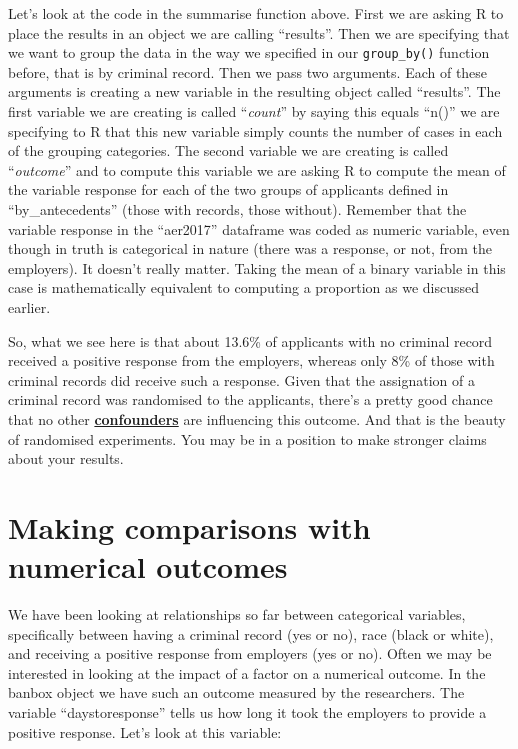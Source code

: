 \documentclass[
]{book}
\begin{document}
Let's look at the code in the summarise function above. First we are asking R to place the results in an object we are calling ``results''. Then we are specifying that we want to group the data in the way we specified in our \texttt{group\_by()} function before, that is by criminal record. Then we pass two arguments. Each of these arguments is creating a new variable in the resulting object called ``results''. The first variable we are creating is called ``\emph{count}'' by saying this equals ``n()'' we are specifying to R that this new variable simply counts the number of cases in each of the grouping categories. The second variable we are creating is called ``\emph{outcome}'' and to compute this variable we are asking R to compute the mean of the variable response for each of the two groups of applicants defined in ``by\_antecedents'' (those with records, those without). Remember that the variable response in the ``aer2017'' dataframe was coded as numeric variable, even though in truth is categorical in nature (there was a response, or not, from the employers). It doesn't really matter. Taking the mean of a binary variable in this case is mathematically equivalent to computing a proportion as we discussed earlier.

So, what we see here is that about 13.6\% of applicants with no criminal record received a positive response from the employers, whereas only 8\% of those with criminal records did receive such a response. Given that the assignation of a criminal record was randomised to the applicants, there's a pretty good chance that no other \href{https://en.wikipedia.org/wiki/Confounding}{\textbf{confounders}} are influencing this outcome. And that is the beauty of randomised experiments. You may be in a position to make stronger claims about your results.

\hypertarget{making-comparisons-with-numerical-outcomes}{%
\section{Making comparisons with numerical outcomes}\label{making-comparisons-with-numerical-outcomes}}

We have been looking at relationships so far between categorical variables, specifically between having a criminal record (yes or no), race (black or white), and receiving a positive response from employers (yes or no). Often we may be interested in looking at the impact of a factor on a numerical outcome. In the banbox object we have such an outcome measured by the researchers. The variable ``daystoresponse'' tells us how long it took the employers to provide a positive response. Let's look at this variable:
\end{document}
